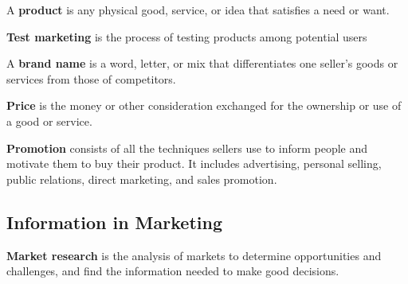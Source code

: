 \documentclass[english, 12pt]{article}
\begin{document}
\begin{defn}
A \textbf{product} is any physical good, service, or idea that satisfies a need or want.
\end{defn}
\begin{defn}
\textbf{Test marketing} is the process of testing products among potential users
\end{defn}
\begin{defn}
A \textbf{brand name} is a word, letter, or mix that differentiates one seller's goods or services from those of competitors.
\end{defn}
\begin{defn}
\textbf{Price} is the money or other consideration exchanged for the ownership or use of a good or service.
\end{defn}
\begin{defn}
\textbf{Promotion} consists of all the techniques sellers use to inform people and motivate them to buy their product. It includes advertising, personal selling, public relations, direct marketing, and sales promotion.
\end{defn}
\subsection{Information in Marketing}
\begin{defn}
\textbf{Market research} is the analysis of markets to determine opportunities and challenges, and find the information needed to make good decisions.
\end{defn}
\end{document}
